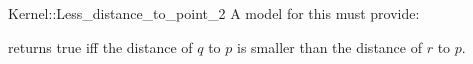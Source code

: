 \begin{ccRefFunctionObjectConcept}{Kernel::Less_distance_to_point_2}
A model for this must provide:


{returns true iff the distance of $q$ to $p$ is
smaller than the distance of $r$ to $p$.}

\end{ccRefFunctionObjectConcept}
